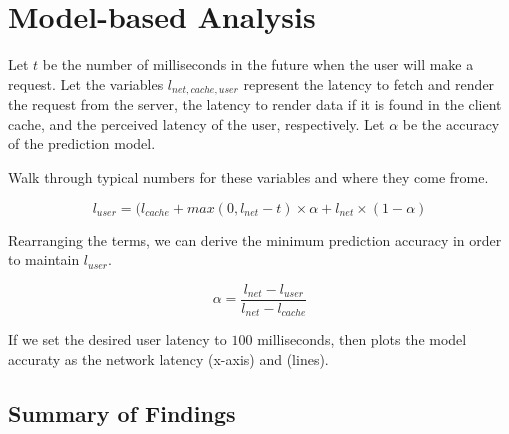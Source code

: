 
\section{Model-based Analysis}


Let $t$ be the number of milliseconds in the future when the user will make a request.
Let the variables $l_{net,cache,user}$ represent the latency to fetch and render the request from the server,
the latency to render data if it is found in the client cache, and the perceived latency of the user, respectively.
Let $\alpha$ be the accuracy of the prediction model.

Walk through typical numbers for these variables and where they come frome.

$$l_{user} = (l_{cache} + max(0, l_{net} - t)\times \alpha + l_{net}\times(1-\alpha) $$

Rearranging the terms, we can derive the minimum prediction accuracy in order to maintain $l_{user}$.

$$\alpha = \frac{l_{net} - l_{user}}{l_{net} - l_{cache}}$$

If we set the desired user latency to $100$ milliseconds, then  plots the model accuraty as the network latency (x-axis) and  (lines).





\subsection{Summary of Findings}

